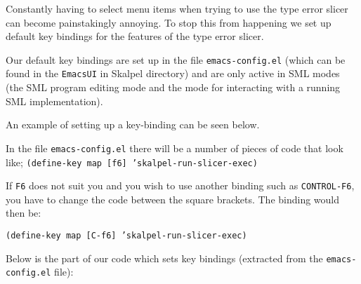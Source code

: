\documentclass{report}
\begin{document}
Constantly having to select menu items when trying to use the type
error slicer can become painstakingly annoying.  To stop this from
happening we set up default key bindings for the features of the type
error slicer.


Our default key bindings are set up in the file
\texttt{emacs-config.el} (which can be found in the
\texttt{EmacsUI} in Skalpel directory) and are only
active in SML modes (the SML program editing mode and the mode for
interacting with a running SML implementation).


\medskip
An example of setting up a key-binding can be seen below.

In the file \texttt{emacs-config.el} there will be a number of
pieces of code that look like;
\texttt{(define-key map [f6] 'skalpel-run-slicer-exec)}

If \texttt{F6} does not suit you and you wish to use another
binding such as \texttt{CONTROL-F6}, you have to change the
code between the square brackets.  The binding would then be:

\texttt{(define-key map [C-f6] 'skalpel-run-slicer-exec)}

\medskip
Below is the part of our code which sets key bindings (extracted from
the \texttt{emacs-config.el} file):
\end{document}
